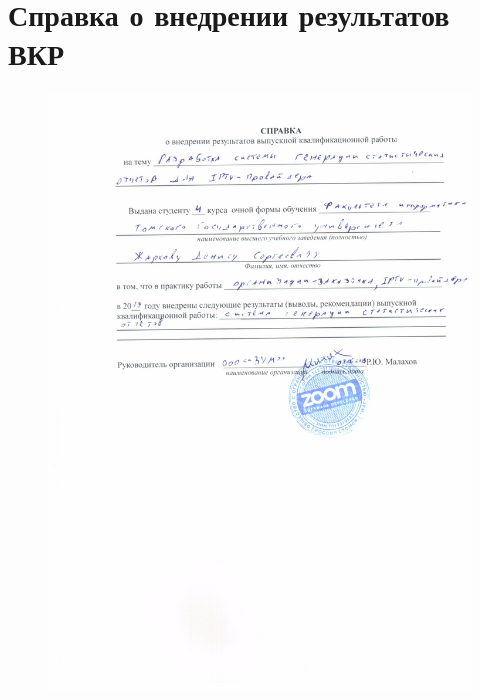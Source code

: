 \appendix

\section{Справка о внедрении результатов ВКР}
\begin{figure}[!ht]
\begin{center}
\hspace*{-1cm} \includegraphics[scale=1, trim=30mm 120mm 0mm 10mm, clip]{../resources/inquiry.pdf}
\end{center}
\end{figure}

\newpage


\newpage

